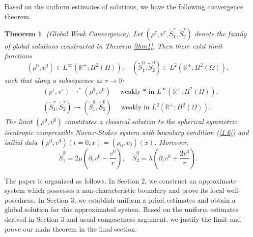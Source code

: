 \documentclass[10pt,reqno]{amsart}
\numberwithin{equation}{section}
\newtheorem{theorem}{Theorem}[section]
\begin{document}
	Based on the uniform estimates of solutions, we have the following convergence theorem.
	\begin{theorem}\label{thm2}
		(Global Weak Convergence).
		Let $(\rho^{\tau},v^{\tau},\tilde{S}_1^{\tau},\tilde{S}_2^{\tau})$ denote the family of global solutions constructed in Theorem \ref{thm1}. Then there exist limit functions
		$$
		(\rho^{0},v^{0}) \in L^{\infty}\left(\mathbb{R}^{+} ; H^2(\Omega)\right), \quad(\tilde{S}_1^{0},\tilde{S}_2^{0}) \in L^2\left(\mathbb{R}^{+} ; H^2(\Omega)\right),
		$$
		such that along a subsequence as $\tau\rightarrow 0$:
		\begin{equation}
			\begin{aligned}
				& \left(\rho^{\tau},v^{\tau}\right) \rightharpoonup^*\left(\rho^{0},v^{0}\right) \quad \text { weakly-* in } L^{\infty}\left(\mathbb{R}^{+} ; H^2(\Omega)\right), \\
				& \left(\tilde{S}_1^{\tau},\tilde{S}_2^{\tau}\right) \rightharpoonup\left(\tilde{S}_1^{0},\tilde{S}_2^{0}\right) \quad \text { weakly in } L^2\left(\mathbb{R}^{+} ; H^2(\Omega)\right) .
			\end{aligned}
		\end{equation}
		The limit $\left(\rho^{0},v^{0}\right)$ constitutes a classical solution to the  spherical symmetric  isentropic compressible Navier-Stokes system  with boundary condition (\ref{1.6}) and initial data $\left(\rho^{0},v^{0}\right)(t=0,x)=(\rho_0,v_0)(x)$. Moreover,
		$$\tilde{S}_1^0=2\mu(\partial_{r}v^0-\frac{v^0}{r}), \quad \tilde{S}_2^0=\lambda(\partial_{r}v^0+\frac{2v^0}{r}).$$
	\end{theorem}
	
	
	
	The paper is organized as follows. In Section 2, we construct an approximate system which possesses a non-characteristic boundary and prove its local well-posedness. In Section 3, we establish  uniform a priori estimates and  obtain a global solution for this approximated system. Based on the uniform estimates derived in Section 3 and usual compactness argument, we justify the limit and prove our main theorem in the final section.
	
\end{document}
